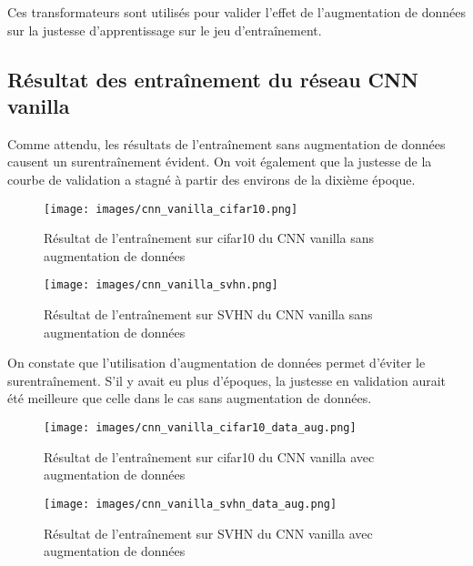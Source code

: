     Ces transformateurs sont utilisés pour valider l'effet de l'augmentation de données sur la justesse d'apprentissage sur le jeu d'entraînement.
    
\subsection{Résultat des entraînement du réseau CNN vanilla}
    Comme attendu, les résultats de l'entraînement sans augmentation de données causent un surentraînement évident. On voit également que la justesse de la courbe de validation a stagné à partir des environs de la dixième époque.
    \begin{figure}[H]
        \centering 
        \texttt{[image: images/cnn\_vanilla\_cifar10.png]}
        \caption{Résultat de l'entraînement sur cifar10 du CNN vanilla sans augmentation de données}
    \end{figure}
    \begin{figure}[H]
        \centering 
        \texttt{[image: images/cnn\_vanilla\_svhn.png]}
        \caption{Résultat de l'entraînement sur SVHN du CNN vanilla sans augmentation de données}
    \end{figure}
    
    On constate que l'utilisation d'augmentation de données permet d'éviter le surentraînement. S'il y avait eu plus d'époques, la justesse en validation aurait été meilleure que celle dans le cas sans augmentation de données.
    \begin{figure}[H]
        \centering 
        \texttt{[image: images/cnn\_vanilla\_cifar10\_data\_aug.png]}
        \caption{Résultat de l'entraînement sur cifar10 du CNN vanilla avec augmentation de données}
    \end{figure}
    \begin{figure}[H]
        \centering 
        \texttt{[image: images/cnn\_vanilla\_svhn\_data\_aug.png]}
        \caption{Résultat de l'entraînement sur SVHN du CNN vanilla avec augmentation de données}
    \end{figure}

